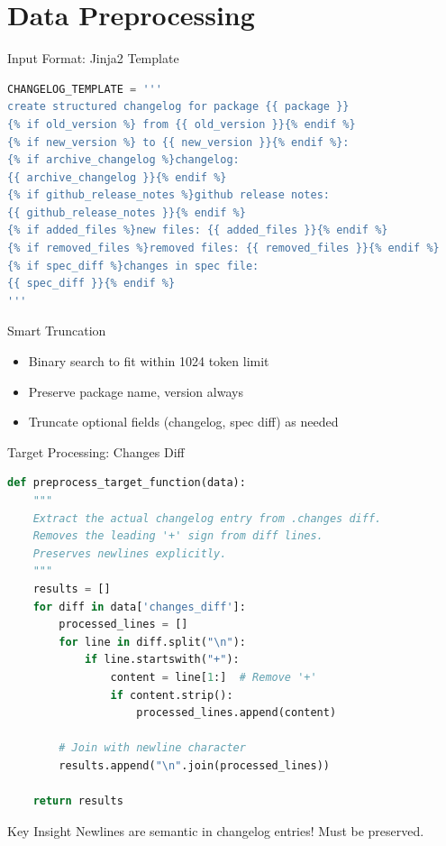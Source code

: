 \section{Data Preprocessing}
\begin{frame}[fragile]{Input Format: Jinja2 Template}
\begin{lstlisting}[language=Python, basicstyle=\ttfamily\tiny]
CHANGELOG_TEMPLATE = '''
create structured changelog for package {{ package }}
{% if old_version %} from {{ old_version }}{% endif %}
{% if new_version %} to {{ new_version }}{% endif %}:
{% if archive_changelog %}changelog:
{{ archive_changelog }}{% endif %}
{% if github_release_notes %}github release notes:
{{ github_release_notes }}{% endif %}
{% if added_files %}new files: {{ added_files }}{% endif %}
{% if removed_files %}removed files: {{ removed_files }}{% endif %}
{% if spec_diff %}changes in spec file:
{{ spec_diff }}{% endif %}
'''
\end{lstlisting}

\begin{block}{Smart Truncation}
\begin{itemize}
  \item Binary search to fit within 1024 token limit
  \item Preserve package name, version always
  \item Truncate optional fields (changelog, spec diff) as needed
\end{itemize}
\end{block}
\end{frame}

\begin{frame}[fragile]{Target Processing: Changes Diff}
\begin{lstlisting}[language=Python]
def preprocess_target_function(data):
    """
    Extract the actual changelog entry from .changes diff.
    Removes the leading '+' sign from diff lines.
    Preserves newlines explicitly.
    """
    results = []
    for diff in data['changes_diff']:
        processed_lines = []
        for line in diff.split("\n"):
            if line.startswith("+"):
                content = line[1:]  # Remove '+'
                if content.strip():
                    processed_lines.append(content)

        # Join with newline character
        results.append("\n".join(processed_lines))

    return results
\end{lstlisting}

\begin{block}{Key Insight}
Newlines are semantic in changelog entries! Must be preserved.
\end{block}
\end{frame}


